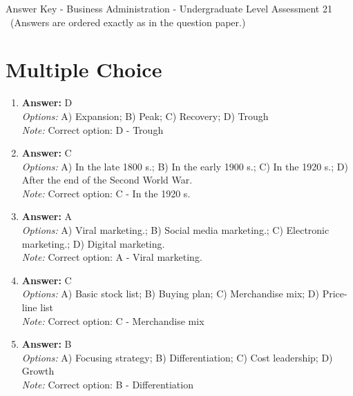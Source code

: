 \documentclass[12pt]{article}
\begin{document}
\begin{center}
Answer Key - Business Administration - Undergraduate Level Assessment 21 \
\small (Answers are ordered exactly as in the question paper.)
\end{center}

\section*{Multiple Choice}
\begin{enumerate}[label=\arabic*.]
\item \textbf{Answer:} D
\\ \textit{Options:} A) Expansion; B) Peak; C) Recovery; D) Trough
\\ \textit{Note:} Correct option: D - Trough
\item \textbf{Answer:} C
\\ \textit{Options:} A) In the late 1800 s.; B) In the early 1900 s.; C) In the 1920 s.; D) After the end of the Second World War.
\\ \textit{Note:} Correct option: C - In the 1920 s.
\item \textbf{Answer:} A
\\ \textit{Options:} A) Viral marketing.; B) Social media marketing.; C) Electronic marketing.; D) Digital marketing.
\\ \textit{Note:} Correct option: A - Viral marketing.
\item \textbf{Answer:} C
\\ \textit{Options:} A) Basic stock list; B) Buying plan; C) Merchandise mix; D) Price-line list
\\ \textit{Note:} Correct option: C - Merchandise mix
\item \textbf{Answer:} B
\\ \textit{Options:} A) Focusing strategy; B) Differentiation; C) Cost leadership; D) Growth
\\ \textit{Note:} Correct option: B - Differentiation
\end{enumerate}
\end{document}
